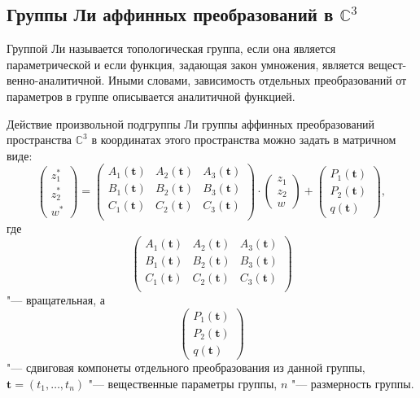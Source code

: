 \documentclass[../main.tex]{subfiles}
\begin{document}
\subsection{Группы Ли аффинных преобразований в $\mathbb{C}^3$}
Группой Ли называется топологическая группа, если она является параметрической и если функция, задающая закон умножения, является {вещест-}{венно-аналитичной}. Иными словами, зависимость отдельных преобразований от параметров в группе описывается аналитичной функцией.

Действие произвольной подгруппы Ли группы аффинных преобразований пространства $\mathbb{C}^3$ в координатах этого пространства можно задать в матричном виде:
\begin{equation}\label{eq:affine_transform}
\begin{pmatrix}
z_1^* \\
z_2^* \\
w^*
\end{pmatrix} =
\begin{pmatrix}
A_1(\mathbf t) & A_2(\mathbf t) & A_3(\mathbf t) \\
B_1(\mathbf t) & B_2(\mathbf t) & B_3(\mathbf t) \\
C_1(\mathbf t) & C_2(\mathbf t) & C_3(\mathbf t) \\
\end{pmatrix}
\cdot
\begin{pmatrix}
z_1 \\
z_2 \\
w
\end{pmatrix}
+
\begin{pmatrix}
P_1(\mathbf t) \\
P_2(\mathbf t) \\
q(\mathbf t)
\end{pmatrix},
\end{equation}
где
\begin{equation*}
\begin{pmatrix}
A_1(\mathbf t) & A_2(\mathbf t) & A_3(\mathbf t) \\
B_1(\mathbf t) & B_2(\mathbf t) & B_3(\mathbf t) \\
C_1(\mathbf t) & C_2(\mathbf t) & C_3(\mathbf t) \\
\end{pmatrix}
\end{equation*}
"--- вращательная, а
\begin{equation*}
\begin{pmatrix}
P_1(\mathbf t) \\
P_2(\mathbf t) \\
q(\mathbf t)
\end{pmatrix}
\end{equation*}
"--- сдвиговая компонеты отдельного преобразования из данной группы, $\mathbf t = (t_1, \hdots, t_n)$ "--- вещественные параметры группы, $n$ "--- размерность группы.
\end{document}
